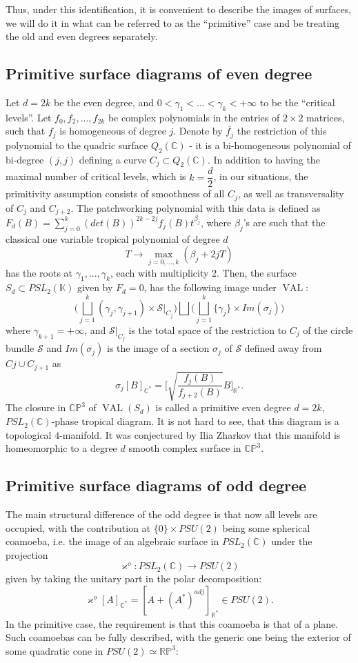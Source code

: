 \documentclass[pdflatex,sn-mathphys-num]{sn-jnl}%
\theoremstyle{thmstyleone}%
\theoremstyle{thmstyletwo}%
\theoremstyle{thmstylethree}%
\newcommand{\R}{\mathbb{R}}
\newcommand{\RP}{\mathbb{R}\mathbb{P}}
\newcommand{\C}{\mathbb{C}}
\newcommand{\p}{{\mathbb{P}}}
\newcommand{\K}{{\mathbb{K}}}
\begin{document}
Thus, under this identification, it is convenient to describe the images of surfaces, we will do it in what can be referred to as the “primitive” case and be treating the old and even degrees separately.
\subsection{Primitive surface diagrams of even degree}

Let $d=2k$ be the even degree, and $0<\gamma_1<... <\gamma_k<+\infty$ to be the “critical levels”. Let $f_0,f_2,...,f_{2k}$ be complex polynomials in the entries of $2\times2$ matrices, such that $f_j$ is homogeneous of degree $j$. Denote by $\overline{f_j}$ the restriction of this polynomial to the quadric surface $Q_2(\C)$ - it is a bi-homogeneous polynomial of bi-degree $(j, j)$ defining a curve $C_j\subset Q_2(\C)$. In addition to having the maximal number of critical levels, which is $k =\dfrac{d}{2}$, in our situations, the primitivity assumption consists of smoothness of all $C_j$, as well as transversality of $C_j$ and  $C_{j+2}$. The patchworking polynomial with this data is defined as $F_d(B)=\displaystyle\sum_{j=0}^{k}(det(B))^{2k-2j}f_j(B)t^{\beta_j}$, where $\beta_j$'s are such that the classical one variable tropical polynomial of degree $d$ $$T\longrightarrow \displaystyle\max_{j=0,...,k} (\beta_j + 2jT)$$ has the roots  at $\gamma_1,...,\gamma_k$, each with multiplicity 2. Then, the surface $S_d\subset PSL_2(\K)$ given by $F_d=0$, has the following image under $\operatorname{VAL}$:
$$\bigg(\bigsqcup_{j=1}^k(\gamma_j,\gamma_{j+1})\times \mathcal{S}|_{C_j}\bigg)\bigsqcup\bigg(\bigsqcup_{j=1}^k\{\gamma_j\}\times Im(\sigma_j)\bigg)$$
where $\gamma_{k+1}=+\infty$, and $\mathcal{S}|_{C_j}$ is the total space of the restriction to $C_j$ of the circle bundle $\mathcal{S}$ and $Im(\sigma_j)$ is the image of a section $\sigma_j$ of $\mathcal{S}$ defined away from $Cj\cup C_{j+1}$ as 
$$\sigma_j[B]_{\C^*}=\displaystyle\bigg[\sqrt{\dfrac{f_j(B)}{f_{j+2}(B)}}B\bigg]_{\R^*}.$$ The closure in $\C\p^3$ of $\operatorname{VAL}(S_d)$ is called a primitive even degree $d=2k$, $PSL_2(\C)$-phase tropical diagram. It is not hard to see, that this diagram is a topological $4$-manifold. It was conjectured by Ilia Zharkov that this manifold is homeomorphic to a degree $d$ smooth complex surface in $\C\p^3$.

\subsection{Primitive surface diagrams of odd degree}
The main structural difference of the odd degree is that
now all levels are occupied, with the contribution at $\{0\}\times PSU(2)$ being some spherical coamoeba, i.e. the image of an algebraic surface in $PSL_2(\C)$ under the projection $$\varkappa^o: PSL_2(\C)\longrightarrow PSU (2)$$ given by taking the unitary part in the polar decomposition: $$\varkappa^o[A]_{\C^*} = [A + (A^*)^{adj}]_{\R^*} \in PSU(2).$$ In the primitive case, the requirement is that this coamoeba is that of a plane. Such coamoebas can be fully described, with the generic one being the exterior of some quadratic cone in $PSU(2)\simeq \RP^3$:
\end{document}
